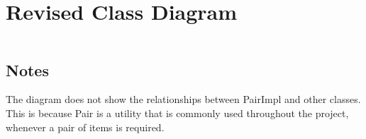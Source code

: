 \documentclass[a4paper]{article}
\begin{document}
\pagebreak

\section{Revised Class Diagram}

\begin{tabular}{p{12cm}}

\end{tabular}

\vspace{19cm}
\subsection*{Notes}
The diagram does not show the relationships between PairImpl and other classes.
This is because Pair is a utility that is commonly used throughout the project, whenever a pair of items is required.
\end{document}
